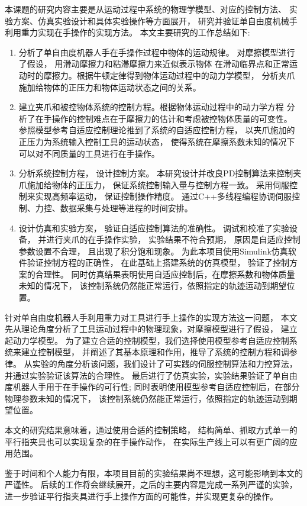 
\conclusion
本课题的研究内容主要是从运动过程中系统的物理学模型、对应的控制方法、
实验方案、仿真实验设计和具体实验操作等方面展开，
研究并验证单自由度机械手利用重力实现在手操作的实现方法。
本文主要研究的工作总结如下:

\begin{enumerate}
  \item 分析了单自由度机器人手在手操作过程中物体的运动规律。
    对摩擦模型进行了假设， 用滑动摩擦力和粘滞摩擦力来近似表示物体
    在滑动临界点和正常运动时的摩擦力。根据牛顿定律得到物体运动过程中的动力学模型，
    分析夹爪施加给物体的正压力和物体运动状态之间的关系。
  \item 建立夹爪和被控物体系统的控制方程。根据物体运动过程中的动力学方程
    分析了在手操作的控制难点在于摩擦力的估计和考虑被控物体质量的可变性。
    参照模型参考自适应控制理论推到了系统的自适应控制方程，
    以夹爪施加的正压力为系统输入控制工具的运动状态，
    使得系统在摩擦系数未知的情况下可以对不同质量的工具进行在手操作。
  \item 分析系统控制方程， 设计控制方案。
    本研究设计并改良PD控制算法来控制夹爪施加给物体的正压力，
    保证系统控制输入量与控制方程一致。
    采用伺服控制来实现高频率运动， 保证控制操作精度。
    通过C++多线程编程协调伺服控制、力控、数据采集与处理等进程的时间安排。
  \item 设计仿真和实验方案， 验证自适应控制算法的准确性。
    调试和校准了实验设备， 并进行夹爪的在手操作实验， 实验结果不符合预期，
    原因是自适应控制参数设置不合理， 且出现了积分饱和现象。
    为此本项目使用Simulink仿真软件验证控制方程的正确性， 在此基础上搭建系统的仿真模型，
    验证了控制方案的合理性。
    同时仿真结果表明使用自适应控制后，在摩擦系数和物体质量未知的情况下，
    该控制系统仍然能正常运行，依照指定的轨迹运动到期望位置。
\end{enumerate}

针对单自由度机器人手利用重力对工具进行手上操作的实现方法这一问题，
本文先从理论角度分析了工具运动过程中的物理现象，对摩擦模型进行了假设，
建立起动力学模型。
为了建立合适的控制模型，我们选择使用模型参考自适应控制系统来建立控制模型，
并阐述了其基本原理和作用，推导了系统的控制方程和调参律。
从实验的角度分析该问题，我们设计了可实践的伺服控制算法和力控算法，
并通过实验验证该算法的合理性。
最后进行了仿真实验，实验结果验证了单自由度机器人手用于在手操作的可行性;
同时表明使用模型参考自适应控制后，在部分物理参数未知的情况下，
该控制系统仍然能正常运行，依照指定的轨迹运动到期望位置。

本文的研究结果意味着，通过使用合适的控制策略，
结构简单、抓取方式单一的平行指夹具也可以实现复杂的在手操作动作，
在实际生产线上可以有更广阔的应用范围。

鉴于时间和个人能力有限，本项目目前的实验结果尚不理想，这可能影响到本文的严谨性。
后续的工作将会继续展开，之后的主要内容是完成一系列严谨的实验，
进一步验证平行指夹具进行手上操作方面的可能性，并实现更复杂的操作。

